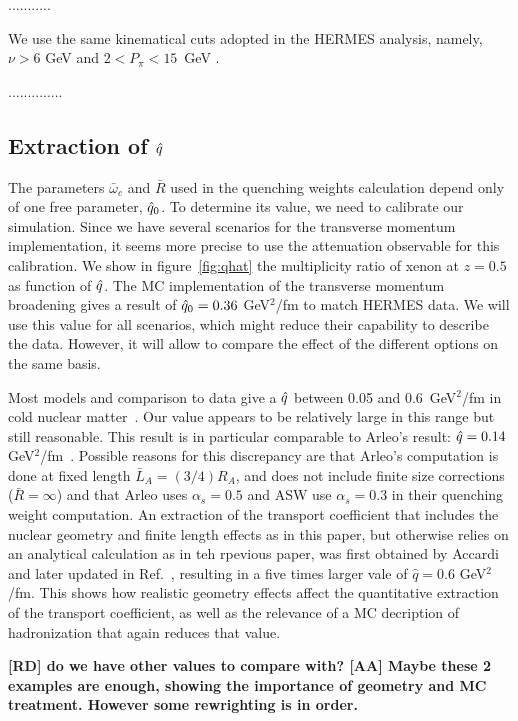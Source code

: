 ...........

We use the same kinematical cuts adopted in the HERMES analysis, namely, $\nu > 6$ GeV and $2 < P_\pi < 15$~GeV \cite{Airapetian:2007vu,Airapetian:2009jy}.

..............


\subsection{Extraction of ${\hat q}$}

The parameters $\bar\omega_c$ and $\bar R$ used in the quenching weights 
calculation depend only of one free parameter, ${\hat q}_0$. To determine its 
value, we need to calibrate our simulation. Since we have several scenarios 
for the transverse momentum implementation, it seems more precise to use the 
attenuation observable for this calibration. We show in figure~\ref{fig:qhat} 
the multiplicity ratio of xenon at $z=0.5$ as function of ${\hat q}$. The MC 
implementation of the transverse momentum broadening gives a result of ${\hat q}_0 
= 0.36$ GeV$^2$/fm to match HERMES data. We will use this value for all 
scenarios, which might reduce their capability to describe the data. However, 
it will allow to compare the effect of the different options on the same basis.

Most models and comparison to data give a ${\hat q}$ between 0.05 and 0.6~GeV$^2$/fm in cold nuclear matter~\cite{Accardi:2009qv}. Our value appears to be relatively large in this range but still reasonable. This result is in particular comparable to Arleo's 
result: ${\hat q} = 0.14$ GeV$^2$/fm~\cite{Arleo:2002ph,Arleo:2003jz}. Possible 
reasons for this discrepancy are that Arleo's computation is done at fixed 
length $\bar L_A = (3/4) R_A$, and does not include finite size corrections 
($\bar R = \infty$) and that Arleo uses $\alpha_s=0.5$ and ASW use 
$\alpha_s=0.3$ in their quenching weight computation. An extraction of the transport coefficient that includes the nuclear geometry and finite length effects as in this paper, but otherwise relies on an analytical calculation as in teh rpevious paper, was first obtained by Accardi \cite{Accardi:2007in} and later updated in Ref.~\cite{Accardi:2009qv}, resulting in a five times larger vale of $\hat q = 0.6$ GeV$^2$/fm. This shows how realistic geometry effects affect the quantitative extraction of the transport coefficient, as well as the relevance of a MC decription of hadronization that again reduces that value. 

{\bf [RD] do we have other values to compare with? [AA] Maybe these 2 examples are enough, showing the importance of geometry and MC treatment. However some rewrighting is in order.}


